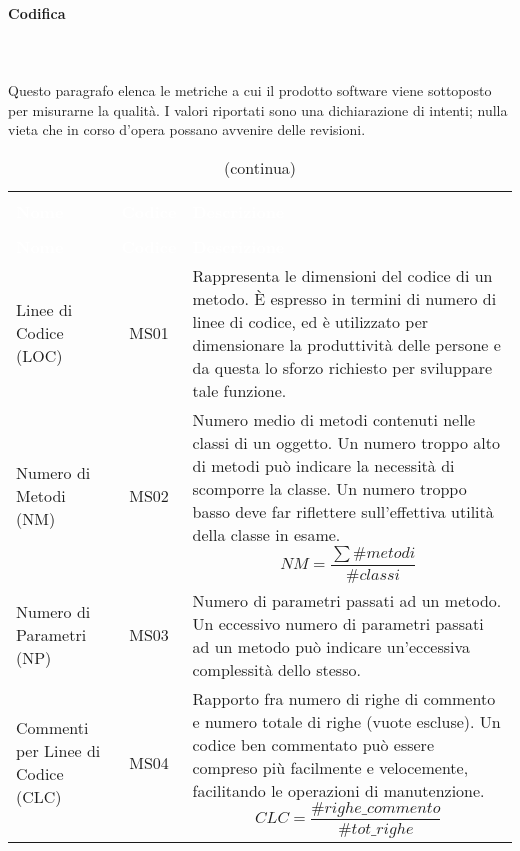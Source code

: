 			\paragraph{Codifica} \mbox{} \\ \mbox{} \\
			Questo paragrafo elenca le metriche a cui il prodotto software viene sottoposto per misurarne la qualità.
			I valori riportati sono una dichiarazione di intenti; nulla vieta che in corso d'opera possano avvenire delle revisioni.
			\begin{longtable}{ C{4.5cm} c L{9.5cm} }
	\caption{Metriche del software}\\
		\textcolor{white}{\textbf{Nome}} & \textcolor{white}{\textbf{Codice}} & \centerline{\textcolor{white}{\textbf{Descrizione}}} \\
		\endfirsthead
		\caption[]{(continua)} \\
		\textcolor{white}{\textbf{Nome}} & \textcolor{white}{\textbf{Codice}} & \centerline{\textcolor{white}{\textbf{Descrizione}}} \\
		\endhead
		\label{par:MS01}Linee di Codice (LOC) & MS01 & Rappresenta  le  dimensioni  del  codice di un metodo. È espresso in termini di numero di linee di codice, ed è utilizzato per dimensionare la produttività delle persone e da questa lo sforzo richiesto per sviluppare tale funzione. \\
		Numero di Metodi (NM)  & MS02 & Numero medio di metodi contenuti nelle classi di un oggetto. Un numero troppo alto di metodi può indicare la necessità di scomporre la classe. Un numero troppo basso deve far riflettere sull'effettiva utilità della classe in esame. 
		\[ NM =\frac{\sum\#metodi}{\#classi}  \] \\
		Numero di Parametri (NP) & MS03 & Numero di parametri passati ad un metodo. Un eccessivo numero di parametri passati ad un metodo può
indicare un'eccessiva complessità dello stesso. \\
		Commenti per Linee di \newline Codice (CLC) & MS04 & Rapporto fra numero di righe di commento e numero totale di righe (vuote escluse). Un codice ben commentato può essere compreso più facilmente e velocemente, facilitando le operazioni di manutenzione. 
		\[ CLC = \frac{\#righe\_commento}{\#tot\_righe}\] \\
	\end{longtable}
